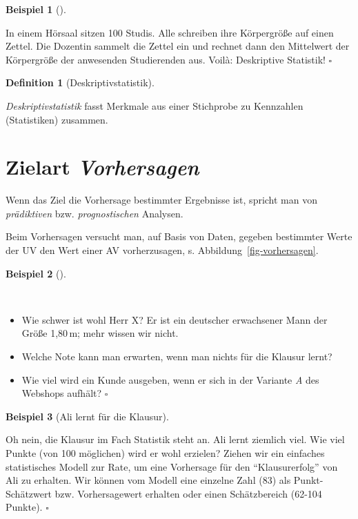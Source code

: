 \documentclass[
  ngerman,
  letterpaper,
  twoside,
  open=any]{scrbook}
\providecommand{\tightlist}{%
  \setlength{\itemsep}{0pt}\setlength{\parskip}{0pt}}\usepackage{longtable,booktabs,array}
\theoremstyle{definition}
\newtheorem{example}{Beispiel}[chapter]
\theoremstyle{plain}
\theoremstyle{definition}
\theoremstyle{definition}
\newtheorem{definition}{Definition}[chapter]
\theoremstyle{definition}
\newtheorem{example}{Beispiel}[chapter]
\theoremstyle{definition}
\theoremstyle{remark}
\begin{document}
\begin{example}[]\protect\hypertarget{exm-desk}{}\label{exm-desk}

In einem Hörsaal sitzen 100 Studis. Alle schreiben ihre Körpergröße auf
einen Zettel. Die Dozentin sammelt die Zettel ein und rechnet dann den
Mittelwert der Körpergröße der anwesenden Studierenden aus. Voilà:
Deskriptive Statistik! \(\square\)

\end{example}

\begin{definition}[Deskriptivstatistik]\protect\hypertarget{def-desk}{}\label{def-desk}

\emph{Deskriptivstatistik} fasst Merkmale aus einer Stichprobe zu
Kennzahlen (Statistiken) zusammen.

\end{definition}

\section{\texorpdfstring{Zielart
\emph{Vorhersagen}}{Zielart Vorhersagen}}\label{zielart-vorhersagen}

Wenn das Ziel die Vorhersage bestimmter Ergebnisse ist, spricht man von
\emph{prädiktiven} bzw. \emph{prognostischen} Analysen.

Beim Vorhersagen versucht man, auf Basis von Daten, gegeben bestimmter
Werte der UV den Wert einer AV vorherzusagen, s.
Abbildung~\ref{fig-vorhersagen}.

\begin{example}[]\protect\hypertarget{exm-ziel-vorhersagen}{}\label{exm-ziel-vorhersagen}

~

\begin{itemize}
\tightlist
\item
  Wie schwer ist wohl Herr X? Er ist ein deutscher erwachsener Mann der
  Größe 1,80\,m; mehr wissen wir nicht.
\item
  Welche Note kann man erwarten, wenn man nichts für die Klausur lernt?
\item
  Wie viel wird ein Kunde ausgeben, wenn er sich in der Variante
  \emph{A} des Webshops aufhält? \(\square\)
\end{itemize}

\end{example}

\begin{example}[Ali lernt für die
Klausur]\protect\hypertarget{exm-ali-lernt}{}\label{exm-ali-lernt}

Oh nein, die Klausur im Fach Statistik steht an. Ali lernt ziemlich
viel. Wie viel Punkte (von 100 möglichen) wird er wohl erzielen? Ziehen
wir ein einfaches statistisches Modell zur Rate, um eine Vorhersage für
den \enquote{Klausurerfolg} von Ali zu erhalten. Wir können vom Modell
eine einzelne Zahl (83) als Punkt-Schätzwert bzw. Vorhersagewert
erhalten oder einen Schätzbereich (62-104 Punkte). \(\square\)

\end{example}
\end{document}
